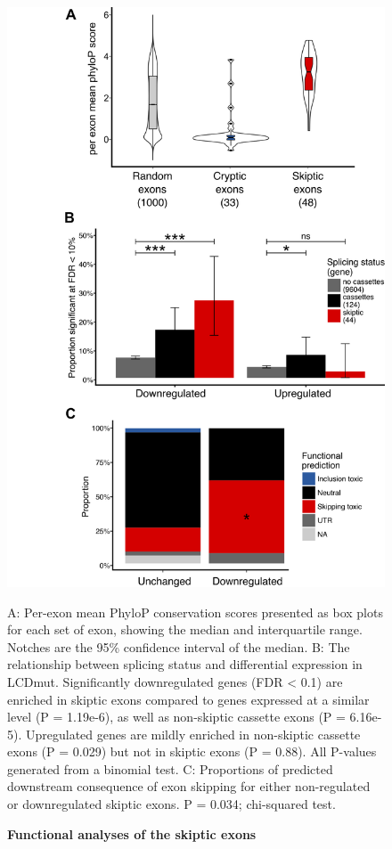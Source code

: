 \begin{figure}[h!]
	\centering
	\includegraphics[width=12cm]{Figures/05_tdp_mice/functional_plots_vertical.png}
	\caption{\textbf{Functional analyses of the skiptic exons}}
	A: Per-exon mean PhyloP conservation scores presented as box plots for each set of exon, showing the median and interquartile range. Notches are the 95\% confidence interval of the median. B: The relationship between splicing status and differential expression in LCDmut. Significantly downregulated genes (FDR < 0.1) are enriched in skiptic exons compared to genes expressed at a similar level (P = 1.19e-6), as well as non-skiptic cassette exons (P = 6.16e-5). Upregulated genes are mildly enriched in non-skiptic cassette exons (P = 0.029) but not in skiptic exons (P = 0.88). All P-values generated from a binomial test. C: Proportions of predicted downstream consequence of exon skipping for either non-regulated or downregulated skiptic exons. P = 0.034; chi-squared test.
	\label{fig:functional_plots}
\end{figure}

